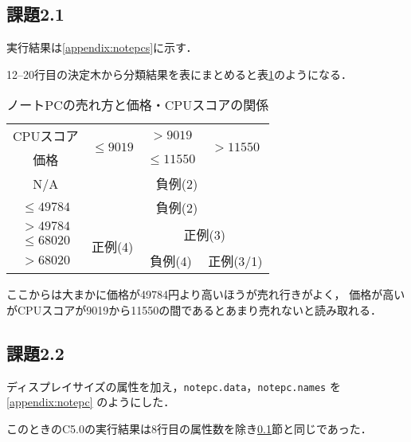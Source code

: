 \documentclass[a4paper, lualatex, ja=standard]{bxjsarticle}
\begin{document}
\subsection{課題2.1} \label{ssec:notepcs}

実行結果は\ref{appendix:notepcs}に示す．

12--20行目の決定木から分類結果を表にまとめると表\ref{tab:notepcs}のようになる．

\begin{table}[bth]
\caption{ノートPCの売れ方と価格・CPUスコアの関係} \label{tab:notepcs}
\begin{center}
    \begin{tabular}{|c|c|c|c|} \hline
        CPUスコア    & \multirow{2}{*}{$\leq 9019$} & $>9019$      & \multirow{2}{*}{$>11550$} \\ \cline{1-1}
        価格         &                              & $\leq 11550$ &                           \\ \hline
        N/A          & \multicolumn{3}{c|}{負例(2)}                                            \\ \hline
        $\leq 49784$ & \multicolumn{3}{c|}{負例(2)}                                            \\ \hline
        $>49784$     & \multirow{3}{*}{正例(4)}     & \multicolumn{2}{c|}{\multirow{2}{*}{正例(3)}} \\
        $\leq 68020$ &                              & \multicolumn{2}{c|}{}                    \\ \cline{1-1}\cline{3-4}
        $>68020$     &                              & 負例(4)      & 正例(3/1)                 \\ \hline
    \end{tabular}
\end{center}
\end{table}

ここからは大まかに価格が49784円より高いほうが売れ行きがよく，
価格が高いがCPUスコアが9019から11550の間であるとあまり売れないと読み取れる．

\subsection{課題2.2}

ディスプレイサイズの属性を加え，\verb|notepc.data|，\verb|notepc.names|
を \ref{appendix:notepc} のようにした．

このときのC5.0の実行結果は8行目の属性数を除き\ref{ssec:notepcs}節と同じであった．
\end{document}
